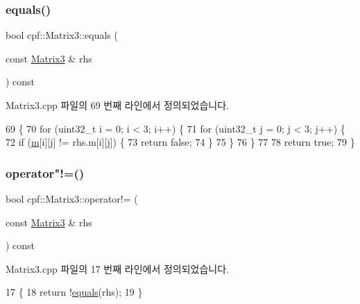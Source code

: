 \subsubsection{\texorpdfstring{equals()}{equals()}}
{\footnotesize\ttfamily bool cpf\+::\+Matrix3\+::equals (\begin{DoxyParamCaption}\item[{const \hyperlink{classcpf_1_1_matrix3}{Matrix3} \&}]{rhs }\end{DoxyParamCaption}) const}



Matrix3.\+cpp 파일의 69 번째 라인에서 정의되었습니다.


\begin{DoxyCode}
69                                                  \{
70         \textcolor{keywordflow}{for} (uint32\_t i = 0; i < 3; i++) \{
71             \textcolor{keywordflow}{for} (uint32\_t j = 0; j < 3; j++) \{
72                 \textcolor{keywordflow}{if} (\hyperlink{classcpf_1_1_matrix3_a544955e219e5edd0c933f5e83dde9fac}{m}[i][j] != rhs.m[i][j]) \{
73                     \textcolor{keywordflow}{return} \textcolor{keyword}{false};
74                 \}
75             \}
76         \}
77 
78         \textcolor{keywordflow}{return} \textcolor{keyword}{true};
79     \}
\end{DoxyCode}
\mbox{\label{classcpf_1_1_matrix3_ad53c54e4df535f11099adeb266bcd425}} 
\subsubsection{\texorpdfstring{operator"!=()}{operator!=()}}
{\footnotesize\ttfamily bool cpf\+::\+Matrix3\+::operator!= (\begin{DoxyParamCaption}\item[{const \hyperlink{classcpf_1_1_matrix3}{Matrix3} \&}]{rhs }\end{DoxyParamCaption}) const}



Matrix3.\+cpp 파일의 17 번째 라인에서 정의되었습니다.


\begin{DoxyCode}
17                                                      \{
18         \textcolor{keywordflow}{return} !\hyperlink{classcpf_1_1_matrix3_a6a2b12e2cba8a6f03c686a363e55934d}{equals}(rhs);
19     \}
\end{DoxyCode}
\mbox{\label{classcpf_1_1_matrix3_a564a8ee457d86385b78bd78d4189c520}} 
